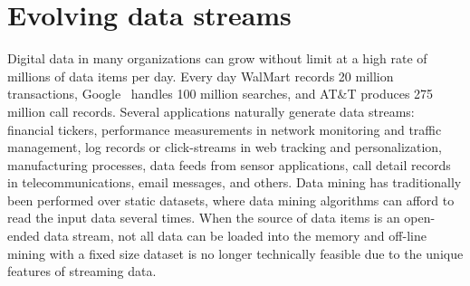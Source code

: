 \chapter{Evolving data streams}
\label{ch:conceptdrift}
\BEGINOMIT
Digital data in many organizations can grow without limit at a high rate of
millions of data items per day. 
Every day WalMart records 20 million transactions, 
Google~\cite{bifet05analysis} handles 100 million searches, and 
AT\&T produces 275 million call records.
Several applications naturally generate data streams: %
 financial tickers, performance measurements in network monitoring 
and traffic management, log records or click-streams in web tracking and 
personalization, manufacturing processes, data feeds from sensor 
applications, call detail records in telecommunications,
email messages, and others. 
\ENDOMIT
Data mining has traditionally
been performed over static datasets, where data mining algorithms can afford to read the input data
several times. When the source of data items is an open-ended data stream, not all data can be
loaded into the memory and off-line mining with a fixed size dataset is no longer technically feasible
due to the unique features of streaming data.




